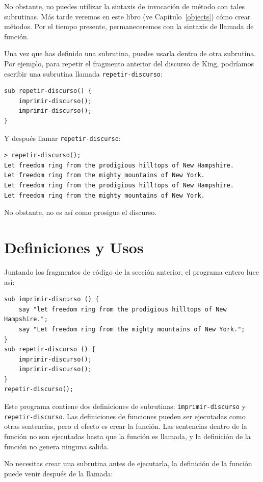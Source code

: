No obstante, no puedes utilizar la sintaxis de invocación de método
con tales subrutinas. Más tarde veremos en este libro (ve
Capítulo~\ref{objects}) cómo crear métodos. Por el tiempo presente,
permaneceremos con la sintaxis de llamada de función.

Una vez que has definido una subrutina, puedes usarla dentro
de otra subrutina. Por ejemplo, para repetir el fragmento anterior
del discurso de King, podríamos escribir una subrutina llamada 
\verb|repetir-discurso|:

\begin{verbatim}
sub repetir-discurso() {
    imprimir-discurso();
    imprimir-discurso();
}
\end{verbatim}
%
Y después llamar \verb|repetir-discurso|:

\begin{verbatim}
> repetir-discurso();
Let freedom ring from the prodigious hilltops of New Hampshire.
Let freedom ring from the mighty mountains of New York.
Let freedom ring from the prodigious hilltops of New Hampshire.
Let freedom ring from the mighty mountains of New York.
\end{verbatim}
%
No obstante, no es así como prosigue el discurso.


\section{Definiciones y Usos}

Juntando los fragmentos de código de la sección anterior, el
programa entero luce así:

\begin{verbatim}
sub imprimir-discurso () {
    say "let freedom ring from the prodigious hilltops of New Hampshire.";
    say "Let freedom ring from the mighty mountains of New York.";
}
sub repetir-discurso () {
    imprimir-discurso();
    imprimir-discurso();
}
repetir-discurso();
\end{verbatim}
%
Este programa contiene dos definiciones de subrutinas: \verb|imprimir-discurso|
y \verb|repetir-discurso|. Las definiciones de funciones pueden ser ejecutadas
como otras sentencias, pero el efecto es crear la función. Las sentencias
dentro de la función no son ejecutadas hasta que la función es llamada, y
la definición de la función no genera ninguna salida.

No necesitas crear una subrutina antes de ejecutarla,
la definición de la función puede venir después de la llamada:

